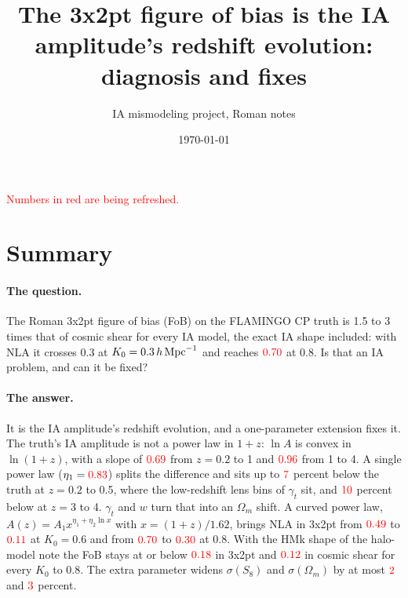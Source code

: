 \documentclass[11pt]{article}
\title{The 3x2pt figure of bias is the IA amplitude's redshift evolution:\\
diagnosis and fixes}
\author{IA mismodeling project, Roman notes}
\date{\today}
\newcommand{\hMpc}{\,h\,{\rm Mpc}^{-1}}
\newcommand{\Om}{\Omega_m}
\newif\ifnumbersfinal
\newcommand{\refresh}[1]{\ifnumbersfinal#1\else\textcolor{red}{#1}\fi}
\begin{document}
\maketitle
\ifnumbersfinal\else
\begin{center}\textcolor{red}{Numbers in red are being refreshed.}\end{center}
\fi

\section*{Summary}

\paragraph{The question.} The Roman 3x2pt figure of bias (FoB) on the
FLAMINGO CP truth is 1.5 to 3 times that of cosmic shear for every IA
model, the exact IA shape included: with NLA it crosses 0.3 at
$K_0=0.3\hMpc$ and reaches $\refresh{\fobTxNlaEight}$ at 0.8. Is that an IA
problem, and can it be fixed?

\paragraph{The answer.} It is the IA amplitude's redshift evolution, and a
one-parameter extension fixes it. The truth's IA amplitude is not a power
law in $1+z$: $\ln A$ is convex in $\ln(1+z)$, with a slope of
$\refresh{\slopeLow}$ from $z=0.2$ to 1 and $\refresh{\slopeHigh}$ from 1
to 4. A single power law ($\eta_1=\refresh{\etaPl}$) splits the difference
and sits up to $\refresh{\plDevMid}$ percent below the truth at $z=0.2$ to 0.5,
where the low-redshift lens bins of $\gamma_t$ sit, and $\refresh{\plDevHigh}$ percent below at
$z=3$ to 4. $\gamma_t$ and $w$ turn that into an $\Om$ shift. A curved power law,
$A(z)=A_1x^{\eta_1+\eta_2\ln x}$ with $x=(1+z)/1.62$, brings NLA in 3x2pt
from $\refresh{\fobTxNlaSix}$ to $\refresh{\fobTxQSix}$ at $K_0=0.6$ and from
$\refresh{\fobTxNlaEight}$ to $\refresh{\fobTxQEight}$ at 0.8. With the HMk
shape of the halo-model note the FoB stays at or below
$\refresh{\fobTxHmkQMax}$ in 3x2pt and $\refresh{\fobCsHmkQMax}$ in cosmic
shear for every $K_0$ to 0.8. The extra parameter widens $\sigma(S_8)$ and
$\sigma(\Om)$ by at most $\refresh{\costTxQSMax}$ and
$\refresh{\costTxQOMax}$ percent.
\end{document}
